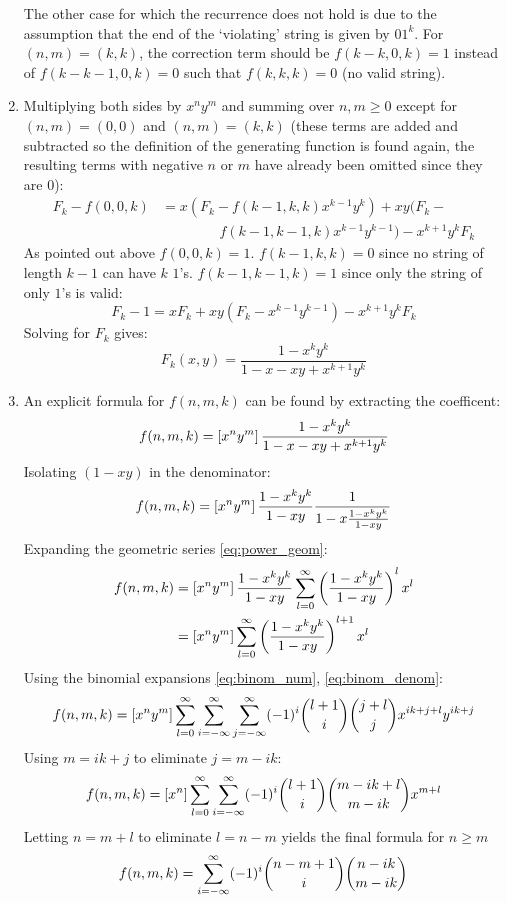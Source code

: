 \begin{solution}
\begin{enumerate}[label=(\alph*)]
        The other case for which the recurrence does not hold is due to the assumption that the end of the `violating' string is given by $01^k$. For $(n,m) = (k,k)$, the correction term should be $f(k-k,0,k) = 1$ instead of $f(k-k-1,0,k) = 0$ such that $f(k,k,k) = 0$ (no valid string).
        \item Multiplying both sides by $x^ny^m$ and summing over $n,m\geq 0$ except for $(n,m) = (0,0)$ and $(n,m) =(k,k)$ (these terms are added and subtracted so the definition of the generating function is found again, the resulting terms with negative $n$ or $m$ have already been omitted since they are $0$):
        \begin{align*}
            F_k - f(0,0,k) &= x(F_k - f(k-1,k,k)x^{k-1}y^k) + 
             xy(F_k - \\
            &\mspace{75mu} f(k-1,k-1,k)x^{k-1}y^{k-1}) - x^{k+1}y^k F_k
        \end{align*}
        As pointed out above $f(0,0,k) = 1$. $f(k-1,k,k) = 0$ since no string of length $k-1$ can have $k$ $1$'s. $f(k-1,k-1,k) = 1$ since only the string of only $1$'s is valid:
        \[
            F_k - 1 = xF_k + xy(F_k - x^{k-1}y^{k-1}) - x^{k+1}y^kF_k
        \]
        Solving for $F_k$ gives:
        \[
            F_k(x,y) = \frac{1-x^ky^k}{1-x-xy+x^{k+1}y^k}
        \]
        \item An explicit formula for $f(n,m,k)$ can be found by extracting the coefficent:
        \[
            f(n,m,k) = \coeff{x^ny^m} \frac{1-x^ky^k}{1-x-xy+x^{k+1}y^k}
        \]
        Isolating $(1-xy)$ in the denominator:
        \[
            f(n,m,k) = \coeff{x^ny^m} \frac{1-x^ky^k}{1-xy}\frac{1}{1 - x\frac{1 - x^ky^k}{1-xy}}
        \]
        Expanding the geometric series \eqref{eq:power_geom}:
        \begin{align*}
            f(n,m,k) &= \coeff{x^ny^m} \frac{1-x^ky^k}{1-xy} \bsum[l] \left(\frac{1-x^ky^k}{1-xy}\right)^l x^l \\
            &= \coeff{x^ny^m} \bsum[l] \left(\frac{1-x^ky^k}{1-xy}\right)^{l+1} x^l 
        \end{align*}
        Using the binomial expansions \eqref{eq:binom_num}, \eqref{eq:binom_denom}:
        \[
            f(n,m,k) = \coeff{x^ny^m} \bsum[l]\infsum[i]\infsum[j] (-1)^{i}\binom{l+1}{i}\binom{j+l}{j} x^{ik+j+l}y^{ik+j}
        \]
        Using $m=ik+j$ to eliminate $j= m - ik$:
        \[
            f(n,m,k) = \coeff{x^n} \bsum[l]\infsum[i] (-1)^i \binom{l+1}{i} \binom{m-ik+l}{m-ik}x^{m+l}
        \]
        Letting $n=m+l$ to eliminate $l=n-m$ yields the final formula for $n\geq m$
        \[
            f(n,m,k) = \infsum[i](-1)^i\binom{n-m+1}{i}\binom{n-ik}{m-ik}
        \]
    \end{enumerate}
\end{solution}

